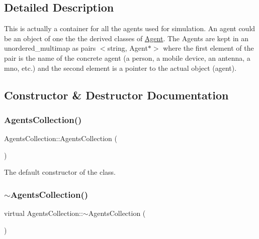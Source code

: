 \subsection{Detailed Description}
This is actually a container for all the agents used for simulation. An agent could be an object of one the the derived classes of \mbox{\hyperlink{class_agent}{Agent}}. The Agents are kept in an unordered\+\_\+multimap as pairs $<$string, Agent$\ast$$>$ where the first element of the pair is the name of the concrete agent (a person, a mobile device, an antenna, a mno, etc.) and the second element is a pointer to the actual object (agent). 

\subsection{Constructor \& Destructor Documentation}
\mbox{\label{class_agents_collection_a866b0ed56c0109e82bc7c839de0a3267}} 
\subsubsection{\texorpdfstring{AgentsCollection()}{AgentsCollection()}}
{\footnotesize\ttfamily Agents\+Collection\+::\+Agents\+Collection (\begin{DoxyParamCaption}{ }\end{DoxyParamCaption})}

The default constructor of the class. \mbox{\label{class_agents_collection_a8a58eb1f8a45cc4d1c0e04dd912dbae0}} 
\subsubsection{\texorpdfstring{$\sim$AgentsCollection()}{~AgentsCollection()}}
{\footnotesize\ttfamily virtual Agents\+Collection\+::$\sim$\+Agents\+Collection (\begin{DoxyParamCaption}{ }\end{DoxyParamCaption})\hspace{0.3cm}{\ttfamily [virtual]}}

